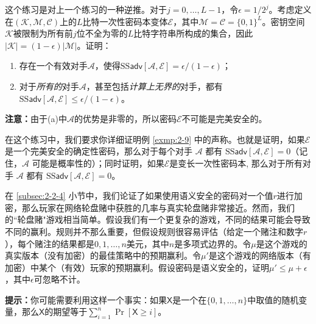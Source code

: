 \begin{exercise}[匹配的边界]\label{exer:2-6}
这个练习是对上一个练习的一种逆推。对于$j=0,\dots,L-1$，令$\epsilon=1/2^j$。考虑定义在$(\mathcal{K},\mathcal{M},\mathcal{C})$上的$L$比特一次性密码本变体$\mathcal{E}$，其中$\mathcal{M}=\mathcal{C}=\{0,1\}^L$。密钥空间$\mathcal{K}$被限制为所有前$j$位不全为零的$L$比特字符串所构成的集合，因此 $|\mathcal{K}|=(1-\epsilon)|\mathcal{M}|$。证明：
\begin{enumerate}[\indent(a)]
	\item 存在一个有效对手$\mathcal{A}$，使得$\mathrm{SS}\mathsf{adv}[\mathcal{A},\mathcal{E}]=\epsilon/(1-\epsilon)$；
	\item 对于\emph{所有的}对手$\mathcal{A}$，甚至包括\emph{计算上无界的}对手，都有$\mathrm{SS}\mathsf{adv}[\mathcal{A},\mathcal{E}]\leq\epsilon/(1-\epsilon)$。
\end{enumerate}
\textbf{注意：}由于(a)中$\mathcal{A}$的优势是非零的，所以密码$\mathcal{E}$不可能是完美安全的。
\end{exercise}

\begin{exercise}[确定性密码]\label{exer:2-7}
在这个练习中，我们要求你详细证明例 \ref{exmp:2-9} 中的声称。也就是证明，如果$\mathcal{E}$是一个完美安全的确定性密码，那么对于每个对手 $\mathcal{A}$ 都有 $\mathrm{SS}\mathsf{adv}[\mathcal{A},\mathcal{E}]=0$（记住，$\mathcal{A}$ 可能是概率性的）；同时证明，如果$\mathcal{E}$是变长一次性密码本, 那么对于所有对手 $\mathcal{A}$ 都有 $\mathrm{SS}\mathsf{adv}[\mathcal{A},\mathcal{E}]=0$。
\end{exercise}

\begin{exercise}[轮盘赌]\label{exer:2-8}
在 \ref{subsec:2-2-4} 小节中，我们论证了如果使用语义安全的密码对一个值$r$进行加密，那么玩家在网络轮盘赌中获胜的几率与真实轮盘赌非常接近。然而，我们的``轮盘赌"游戏相当简单。假设我们有一个更复杂的游戏，不同的结果可能会导致不同的赢利。规则并不那么重要，但假设规则很容易评估（给定一个赌注和数字$r$），每个赌注的结果都是$0,1,\dots,n$美元，其中$n$是多项式边界的。令$\mu$是这个游戏的真实版本（没有加密）的最佳策略中的预期赢利。令$\mu'$是这个游戏的网络版本（有加密）中某个（有效）玩家的预期赢利。假设密码是语义安全的，证明$\mu'\leq\mu+\epsilon$，其中$\epsilon$可忽略不计。

	\vspace{3pt}
	
\noindent
\textbf{提示：}你可能需要利用这样一个事实：如果$\mathsf{X}$是一个在$\{0,1,\dots,n\}$中取值的随机变量，那么$\mathsf{X}$的期望等于$\sum_{i=1}^n\Pr[\mathsf{X}\geq i]$。
\end{exercise}

